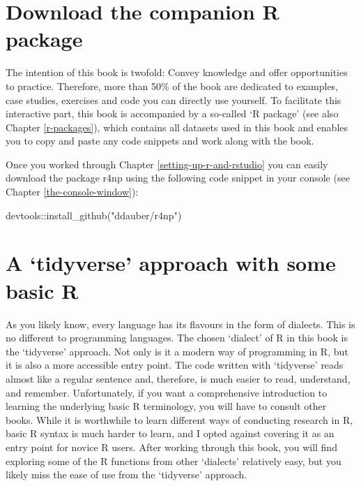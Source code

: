 \documentclass[
]{book}
\newenvironment{Shaded}{\begin{snugshade}}{\end{snugshade}}
\newcommand{\FunctionTok}[1]{\textcolor[rgb]{0.00,0.00,0.00}{#1}}
\newcommand{\NormalTok}[1]{#1}
\newcommand{\SpecialCharTok}[1]{\textcolor[rgb]{0.00,0.00,0.00}{#1}}
\newcommand{\StringTok}[1]{\textcolor[rgb]{0.31,0.60,0.02}{#1}}
\begin{document}
\hypertarget{download-the-companion-r-package}{%
\section{Download the companion R package}\label{download-the-companion-r-package}}

The intention of this book is twofold: Convey knowledge and offer opportunities to practice. Therefore, more than 50\% of the book are dedicated to examples, case studies, exercises and code you can directly use yourself. To facilitate this interactive part, this book is accompanied by a so-called `R package' (see also Chapter \ref{r-packages}), which contains all datasets used in this book and enables you to copy and paste any code snippets and work along with the book.

Once you worked through Chapter \ref{setting-up-r-and-rstudio} you can easily download the package r4np using the following code snippet in your console (see Chapter \ref{the-console-window}):

\begin{Shaded}
\begin{Highlighting}[]
\NormalTok{devtools}\SpecialCharTok{::}\FunctionTok{install\_github}\NormalTok{(}\StringTok{"ddauber/r4np"}\NormalTok{)}
\end{Highlighting}
\end{Shaded}

\hypertarget{a-tidyverse-approach-with-some-basic-r}{%
\section{A `tidyverse' approach with some basic R}\label{a-tidyverse-approach-with-some-basic-r}}

As you likely know, every language has its flavours in the form of dialects. This is no different to programming languages. The chosen `dialect' of R in this book is the `tidyverse' approach. Not only is it a modern way of programming in R, but it is also a more accessible entry point. The code written with `tidyverse' reads almost like a regular sentence and, therefore, is much easier to read, understand, and remember. Unfortunately, if you want a comprehensive introduction to learning the underlying basic R terminology, you will have to consult other books. While it is worthwhile to learn different ways of conducting research in R, basic R syntax is much harder to learn, and I opted against covering it as an entry point for novice R users. After working through this book, you will find exploring some of the R functions from other `dialects' relatively easy, but you likely miss the ease of use from the `tidyverse' approach.
\end{document}
